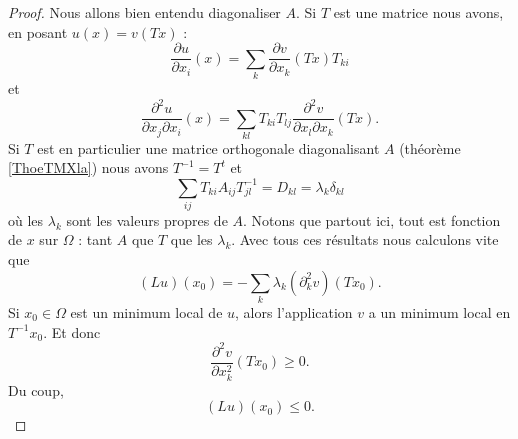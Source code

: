 \begin{proof}
    Nous allons bien entendu diagonaliser \( A\). Si \( T\) est une matrice nous avons, en posant \( u(x)=v(Tx)\) :
    \begin{equation}
        \frac{ \partial u }{ \partial x_i }(x)=\sum_k\frac{ \partial v }{ \partial x_k }(Tx)T_{ki}
    \end{equation}
    et
    \begin{equation}
        \frac{ \partial^2u }{ \partial x_j\partial x_i }(x)=\sum_{kl}T_{ki}T_{lj}\frac{ \partial^2v }{ \partial x_l\partial x_k }(Tx).
    \end{equation}
    Si \( T\) est en particulier une matrice orthogonale diagonalisant \( A\) (théorème \ref{ThoeTMXla}) nous avons \( T^{-1}=T^t\) et
    \begin{equation}
        \sum_{ij}T_{ki}A_{ij}T^{-1}_{jl}=D_{kl}=\lambda_k\delta_{kl}
    \end{equation}
    où les \( \lambda_k\) sont les valeurs propres de \( A\). Notons que partout ici, tout est fonction de \( x\) sur \( \Omega\) : tant \( A\) que \( T\) que les \( \lambda_k\). Avec tous ces résultats nous calculons vite que
    \begin{equation}
        (Lu)(x_0)=-\sum_k\lambda_k(\partial^2_kv)(Tx_0).
    \end{equation}
    Si \( x_0\in \Omega\) est un minimum local de \( u\), alors l'application \( v\) a un minimum local en \( T^{-1} x_0\). Et donc 
    \begin{equation}
        \frac{ \partial^2v }{ \partial x_k^2 }(Tx_0)\geq 0.
    \end{equation}
    Du coup,
    \begin{equation}
        (Lu)(x_0)\leq 0.
    \end{equation}
\end{proof}


